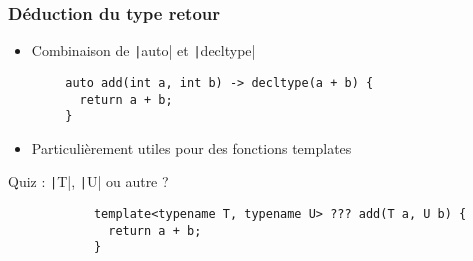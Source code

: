\documentclass[C++.tex]{subfiles}
\begin{document}
\begin{frame}[fragile]
	\frametitle{Déduction du type retour}
	\begin{itemize}
		\item Combinaison de \texttt|auto| et \texttt|decltype|
	\end{itemize}

	\begin{verbatim}
		auto add(int a, int b) -> decltype(a + b) {
		  return a + b;
		}
	\end{verbatim}

	\begin{itemize}
		\item Particulièrement utiles pour des fonctions templates
	\end{itemize}

	\begin{block}{Quiz : \texttt|T|, \texttt|U| ou autre ?}
		\begin{verbatim}
			template<typename T, typename U> ??? add(T a, U b) {
			  return a + b;
			}
		\end{verbatim}
	\end{block}

\end{frame}
\end{document}
